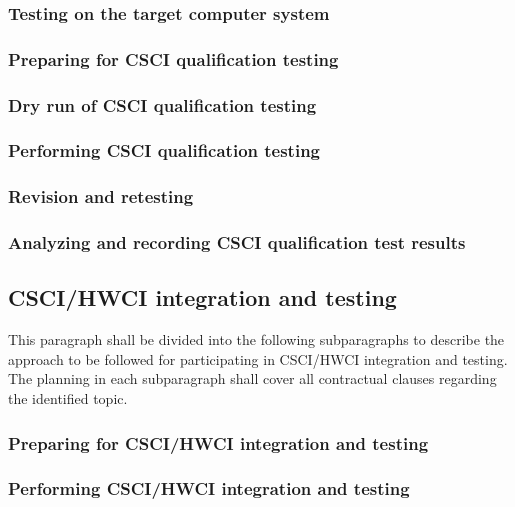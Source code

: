 \documentclass{fidata-report-template}
\begin{document}
\subsubsection{Testing on the target computer system}

\subsubsection{Preparing for CSCI qualification testing}

\subsubsection{Dry run of CSCI qualification testing}

\subsubsection{Performing CSCI qualification testing}

\subsubsection{Revision and retesting}

\subsubsection{Analyzing and recording CSCI qualification test results}

\subsection{CSCI/HWCI integration and testing}

This paragraph shall be divided into the following subparagraphs to
describe the approach to be followed for participating in CSCI/HWCI
integration and testing. The planning in each subparagraph shall cover
all contractual clauses regarding the identified topic.

\subsubsection{Preparing for CSCI/HWCI integration and testing}

\subsubsection{Performing CSCI/HWCI integration and testing}
\end{document}
